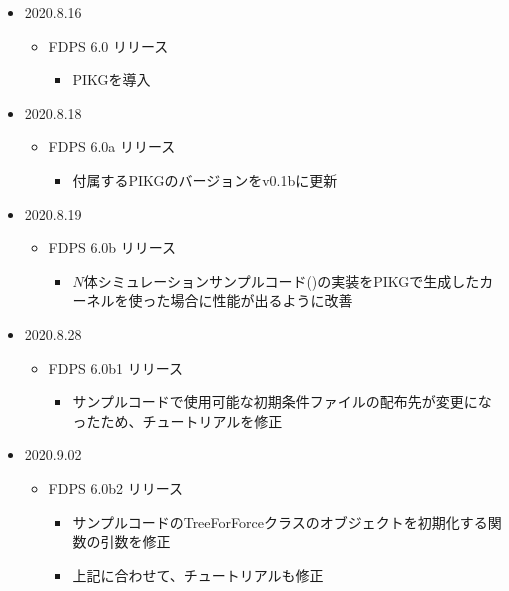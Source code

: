\begin{itemize}
  \item 2020.8.16
    \begin{itemize}
    \item FDPS 6.0 リリース
       \begin{itemize}
          \item PIKGを導入
       \end{itemize}
    \end{itemize}
    
  \item 2020.8.18
    \begin{itemize}
    \item FDPS 6.0a リリース
       \begin{itemize}
          \item 付属するPIKGのバージョンをv0.1bに更新
       \end{itemize}
    \end{itemize}

  \item 2020.8.19
    \begin{itemize}
    \item FDPS 6.0b リリース
       \begin{itemize}
          \item $N$体シミュレーションサンプルコード()の実装をPIKGで生成したカーネルを使った場合に性能が出るように改善
       \end{itemize}
    \end{itemize}

  \item 2020.8.28
    \begin{itemize}
    \item FDPS 6.0b1 リリース
       \begin{itemize}
          \item サンプルコードで使用可能な初期条件ファイルの配布先が変更になったため、チュートリアルを修正
       \end{itemize}
    \end{itemize}


  \item 2020.9.02
    \begin{itemize}
    \item FDPS 6.0b2 リリース
       \begin{itemize}
          \item サンプルコードのTreeForForceクラスのオブジェクトを初期化する関数の引数を修正
          \item 上記に合わせて、チュートリアルも修正
       \end{itemize}
    \end{itemize}



\end{itemize}
